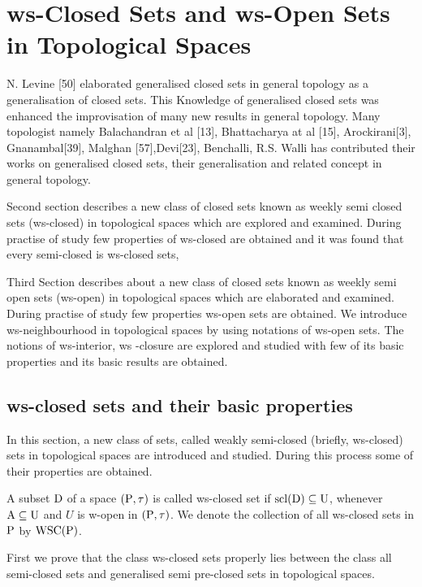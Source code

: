\chapter{ws-Closed Sets and ws-Open Sets in Topological Spaces}
\graphicspath{{Chapter2/Chapter2Figs/EPS/}{Chapter2/Chapter2Figs/}}

N. Levine [50] elaborated generalised closed sets in general topology as a generalisation of closed sets. This Knowledge of generalised closed sets was enhanced the improvisation of many new results in general topology. Many topologist namely Balachandran et al [13], Bhattacharya at al [15], Arockirani[3], Gnanambal[39], Malghan [57],Devi[23], Benchalli, R.S. Walli has contributed their works on generalised closed sets, their generalisation and related concept in general topology.

Second section describes a new class of closed sets known as weekly semi closed sets (ws-closed) in topological spaces which are explored and examined. During practise of study few properties of ws-closed are obtained and it was found that every semi-closed is ws-closed sets,

Third Section describes about a new class of closed sets known as weekly semi open sets (ws-open) in topological spaces which are elaborated and examined. During practise of study few properties ws-open sets are obtained. We introduce ws-neighbourhood in topological spaces by using notations of ws-open sets. The notions of ws-interior, ws -closure are explored and studied with few of its basic properties and its basic results are obtained.

\section{ws-closed sets and their basic properties}\label{sec}

In this section, a new class of sets, called weakly semi-closed (briefly, ws-closed) sets in topological spaces are introduced and studied. During this process some of their properties are obtained.

\begin{dfn}\label{defi2.2.1}
A subset $\mathrm{D}$ of a space $(\mathrm{P},\tau)$ is called ws-closed set if $\mathrm{scl}(\mathrm{D}) \subseteq \mathrm{U}$, whenever $\mathrm{A} \subseteq \mathrm{U}$ and $U$ is w-open in $(\mathrm{P},\tau)$. We denote the collection of all ws-closed sets in $\mathrm{P}$ by $\mbox{WSC}(\mathrm{P})$.
\end{dfn}

First we prove that the class ws-closed sets properly lies between the class all semi-closed sets and generalised semi pre-closed sets in topological spaces.

